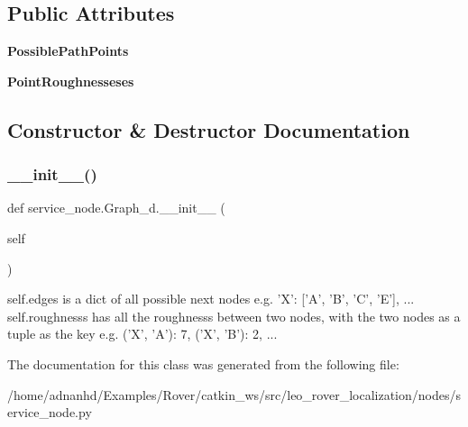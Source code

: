 \subsection*{Public Attributes}
\begin{DoxyCompactItemize}
\item 
\mbox{\label{classservice__node_1_1Graph__d_ac8312e991685daf3d8ae7f1c89734287}} 
{\bfseries Possible\+Path\+Points}
\item 
\mbox{\label{classservice__node_1_1Graph__d_a7a94a0789e58110d2e5fece70623f53c}} 
{\bfseries Point\+Roughnesseses}
\end{DoxyCompactItemize}


\subsection{Constructor \& Destructor Documentation}
\mbox{\label{classservice__node_1_1Graph__d_a76ed82f1e5e08fb2fbd979a1c7a988ee}} 
\subsubsection{\texorpdfstring{\+\_\+\+\_\+init\+\_\+\+\_\+()}{\_\_init\_\_()}}
{\footnotesize\ttfamily def service\+\_\+node.\+Graph\+\_\+d.\+\_\+\+\_\+init\+\_\+\+\_\+ (\begin{DoxyParamCaption}\item[{}]{self }\end{DoxyParamCaption})}

\begin{DoxyVerb}self.edges is a dict of all possible next nodes
e.g. {'X': ['A', 'B', 'C', 'E'], ...}
self.roughnesss has all the roughnesss between two nodes,
with the two nodes as a tuple as the key
e.g. {('X', 'A'): 7, ('X', 'B'): 2, ...}
\end{DoxyVerb}
 

The documentation for this class was generated from the following file\+:\begin{DoxyCompactItemize}
\item 
/home/adnanhd/\+Examples/\+Rover/catkin\+\_\+ws/src/leo\+\_\+rover\+\_\+localization/nodes/service\+\_\+node.\+py\end{DoxyCompactItemize}
